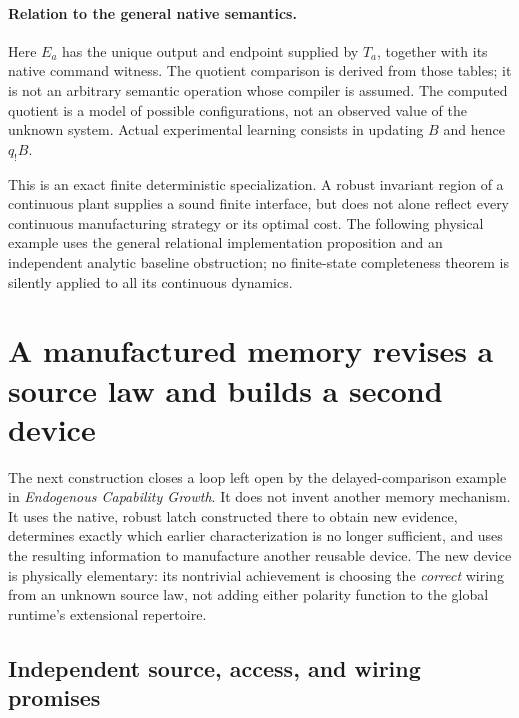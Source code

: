\documentclass[11pt]{article}
\theoremstyle{definition}
\theoremstyle{remark}
\begin{document}
\paragraph{Relation to the general native semantics.}
Here $E_a$ has the unique output and endpoint supplied by $T_a$, together
with its native command witness. The quotient comparison is derived
from those tables; it is not an arbitrary semantic operation whose
compiler is assumed. The computed quotient is a model of possible
configurations, not an observed value of the unknown system. Actual
experimental learning consists in updating $B$ and hence $q_!B$.

This is an exact finite deterministic specialization. A robust invariant
region of a continuous plant supplies a sound finite interface, but does
not alone reflect every continuous manufacturing strategy or its optimal
cost. The following physical example uses the general relational
implementation proposition and an independent analytic baseline
obstruction; no finite-state completeness theorem is silently applied to
all its continuous dynamics.



\section{A manufactured memory revises a source law and builds a second device}
\label{arc:sec:latch-corrector}

The next construction closes a loop left open by the delayed-comparison
example in \emph{Endogenous Capability Growth}. It does not invent another
memory mechanism. It uses the native, robust latch constructed there to
obtain new evidence, determines exactly which earlier characterization is
no longer sufficient, and uses the resulting information to manufacture
another reusable device. The new device is physically elementary: its
nontrivial achievement is choosing the \emph{correct} wiring from an
unknown source law, not adding either polarity function to the global
runtime's extensional repertoire.

\subsection{Independent source, access, and wiring promises}
\end{document}
